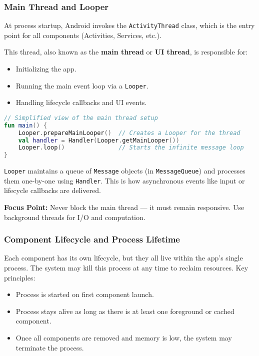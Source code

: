 \documentclass[a4paper,12pt]{article}
\begin{document}
\subsubsection{Main Thread and Looper}

At process startup, Android invokes the \texttt{ActivityThread} class, which is the entry point for all components (Activities, Services, etc.).

This thread, also known as the \textbf{main thread} or \textbf{UI thread}, is responsible for:
\begin{itemize}
  \item Initializing the app.
  \item Running the main event loop via a \texttt{Looper}.
  \item Handling lifecycle callbacks and UI events.
\end{itemize}

\begin{lstlisting}[language=Kotlin]
// Simplified view of the main thread setup
fun main() {
    Looper.prepareMainLooper()  // Creates a Looper for the thread
    val handler = Handler(Looper.getMainLooper())
    Looper.loop()               // Starts the infinite message loop
}
\end{lstlisting}

\texttt{Looper} maintains a queue of \texttt{Message} objects (in \texttt{MessageQueue}) and processes them one-by-one using \texttt{Handler}. This is how asynchronous events like input or lifecycle callbacks are delivered.

\textbf{Focus Point:} Never block the main thread — it must remain responsive. Use background threads for I/O and computation.

\subsubsection{Component Lifecycle and Process Lifetime}

Each component has its own lifecycle, but they all live within the app’s single process. The system may kill this process at any time to reclaim resources. Key principles:
\begin{itemize}
  \item Process is started on first component launch.
  \item Process stays alive as long as there is at least one foreground or cached component.
  \item Once all components are removed and memory is low, the system may terminate the process.
\end{itemize}
\end{document}
